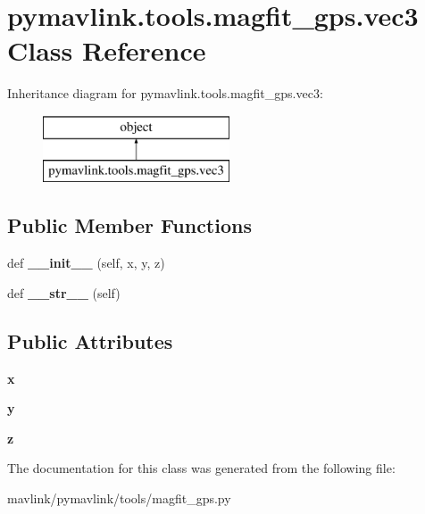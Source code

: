 \hypertarget{classpymavlink_1_1tools_1_1magfit__gps_1_1vec3}{}\section{pymavlink.\+tools.\+magfit\+\_\+gps.\+vec3 Class Reference}
\label{classpymavlink_1_1tools_1_1magfit__gps_1_1vec3}
Inheritance diagram for pymavlink.\+tools.\+magfit\+\_\+gps.\+vec3\+:\begin{figure}[H]
\begin{center}
\leavevmode
\includegraphics[height=2.000000cm]{classpymavlink_1_1tools_1_1magfit__gps_1_1vec3}
\end{center}
\end{figure}
\subsection*{Public Member Functions}
\begin{DoxyCompactItemize}
\item 
\mbox{\label{classpymavlink_1_1tools_1_1magfit__gps_1_1vec3_a3302b13d06f07834294c0a4e978808de}} 
def {\bfseries \+\_\+\+\_\+init\+\_\+\+\_\+} (self, x, y, z)
\item 
\mbox{\label{classpymavlink_1_1tools_1_1magfit__gps_1_1vec3_aa1a57c61eadfd5a3996c4ddb923f23ef}} 
def {\bfseries \+\_\+\+\_\+str\+\_\+\+\_\+} (self)
\end{DoxyCompactItemize}
\subsection*{Public Attributes}
\begin{DoxyCompactItemize}
\item 
\mbox{\label{classpymavlink_1_1tools_1_1magfit__gps_1_1vec3_a4ad87009521fb010ec5978e9f0efaf03}} 
{\bfseries x}
\item 
\mbox{\label{classpymavlink_1_1tools_1_1magfit__gps_1_1vec3_ad72ebec20299e4ea4125a12f2443334a}} 
{\bfseries y}
\item 
\mbox{\label{classpymavlink_1_1tools_1_1magfit__gps_1_1vec3_a33b7c1a48c1646258532de882dbe4540}} 
{\bfseries z}
\end{DoxyCompactItemize}


The documentation for this class was generated from the following file\+:\begin{DoxyCompactItemize}
\item 
mavlink/pymavlink/tools/magfit\+\_\+gps.\+py\end{DoxyCompactItemize}
